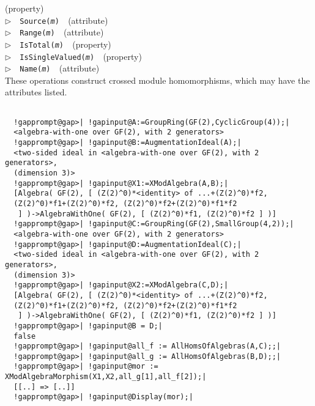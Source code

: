 \documentclass[a4paper,11pt]{report}
\begin{document}
{{{{{}\hfill{\scriptsize (property)}}\\
\noindent\textcolor{FuncColor}{$\triangleright$\ \ \texttt{Source({\mdseries\slshape m})
\label{Source}
}\hfill{\scriptsize (attribute)}}\\
\noindent\textcolor{FuncColor}{$\triangleright$\ \ \texttt{Range({\mdseries\slshape m})
\label{Range}
}\hfill{\scriptsize (attribute)}}\\
\noindent\textcolor{FuncColor}{$\triangleright$\ \ \texttt{IsTotal({\mdseries\slshape m})
\label{IsTotal}
}\hfill{\scriptsize (property)}}\\
\noindent\textcolor{FuncColor}{$\triangleright$\ \ \texttt{IsSingleValued({\mdseries\slshape m})
\label{IsSingleValued}
}\hfill{\scriptsize (property)}}\\
\noindent\textcolor{FuncColor}{$\triangleright$\ \ \texttt{Name({\mdseries\slshape m})
\label{Name}
}\hfill{\scriptsize (attribute)}}\\


 These operations construct crossed module homomorphisms, which may have the
attributes listed. }

 
\begin{Verbatim}[commandchars=!@|,fontsize=\small,frame=single,label=Example]
  
  !gapprompt@gap>| !gapinput@A:=GroupRing(GF(2),CyclicGroup(4));|
  <algebra-with-one over GF(2), with 2 generators>
  !gapprompt@gap>| !gapinput@B:=AugmentationIdeal(A);|
  <two-sided ideal in <algebra-with-one over GF(2), with 2 generators>, 
  (dimension 3)>
  !gapprompt@gap>| !gapinput@X1:=XModAlgebra(A,B);|
  [Algebra( GF(2), [ (Z(2)^0)*<identity> of ...+(Z(2)^0)*f2, 
  (Z(2)^0)*f1+(Z(2)^0)*f2, (Z(2)^0)*f2+(Z(2)^0)*f1*f2
   ] )->AlgebraWithOne( GF(2), [ (Z(2)^0)*f1, (Z(2)^0)*f2 ] )]
  !gapprompt@gap>| !gapinput@C:=GroupRing(GF(2),SmallGroup(4,2));|
  <algebra-with-one over GF(2), with 2 generators>
  !gapprompt@gap>| !gapinput@D:=AugmentationIdeal(C);|
  <two-sided ideal in <algebra-with-one over GF(2), with 2 generators>, 
  (dimension 3)>
  !gapprompt@gap>| !gapinput@X2:=XModAlgebra(C,D);|
  [Algebra( GF(2), [ (Z(2)^0)*<identity> of ...+(Z(2)^0)*f2, 
  (Z(2)^0)*f1+(Z(2)^0)*f2, (Z(2)^0)*f2+(Z(2)^0)*f1*f2
   ] )->AlgebraWithOne( GF(2), [ (Z(2)^0)*f1, (Z(2)^0)*f2 ] )]
  !gapprompt@gap>| !gapinput@B = D;|
  false
  !gapprompt@gap>| !gapinput@all_f := AllHomsOfAlgebras(A,C);;|
  !gapprompt@gap>| !gapinput@all_g := AllHomsOfAlgebras(B,D);;|
  !gapprompt@gap>| !gapinput@mor := XModAlgebraMorphism(X1,X2,all_g[1],all_f[2]);|
  [[..] => [..]]
  !gapprompt@gap>| !gapinput@Display(mor);|
  

\end{Verbatim}}}
\end{document}
